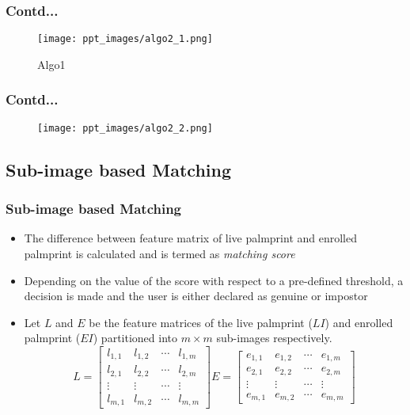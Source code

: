 \documentclass{beamer}
\begin{document}
\begin{frame}
\frametitle{Contd...}
	\begin{figure}[htp]
\begin{center}
\texttt{[image: ppt\_images/algo2\_1.png]}
\caption{Algo1\label{alg1} }
\end{center}
\end{figure}
\end{frame}

\begin{frame}
\frametitle{Contd...}
	\begin{figure}[htp]
\begin{center}
\texttt{[image: ppt\_images/algo2\_2.png]}
\end{center}
\end{figure}
\end{frame}


\subsection{Sub-image based Matching}

\begin{frame}
\frametitle{Sub-image based Matching}
\begin{itemize}
\item The difference between feature matrix of live palmprint and enrolled palmprint is calculated and is termed as \emph{matching score} 
\item Depending on the value of the score with respect to a pre-defined threshold, a decision is made and the user is either declared as genuine or impostor 
\item Let $L$ and $E$ be the feature matrices of the live palmprint ($LI$) and enrolled palmprint ($EI$) partitioned into $m \times m$ sub-images respectively.  
\begin{equation}
  L = \begin{bmatrix} l_{1,1} & l_{1,2} & \cdots & l_{1,m}\\ l_{2,1} & l_{2,2} & \cdots & l_{2,m}\\ \vdots & \vdots & \cdots & \vdots \\ l_{m,1} & l_{m,2} & \cdots & l_{m,m}\end{bmatrix}
  E = \begin{bmatrix} e_{1,1} & e_{1,2} & \cdots & e_{1,m}\\ e_{2,1} & e_{2,2} & \cdots & e_{2,m}\\ \vdots & \vdots & \cdots & \vdots \\ e_{m,1} & e_{m,2} & \cdots & e_{m,m}\end{bmatrix}
\end{equation}
\end{itemize}
\end{frame}
\end{document}
